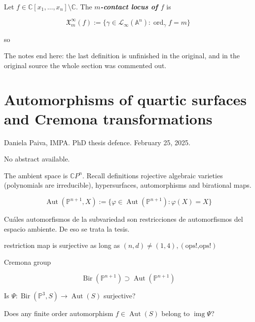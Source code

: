\begin{definition}
\label{definition-badur-3}
Let $f \in
\mathbb{C}[x_1,\ldots,x_n]\setminus
\mathbb{C}$. The \textit{\textbf{$m$-contact
locus of $f$}} is

$$
\mathfrak{X}_{m}^\infty(f):=\{\gamma \in
\mathcal{L}_\infty(\mathbb{A}^n):
\operatorname{ord}_\gamma f=m\}
$$

so
\end{definition}

\medskip{} The
notes end here: the last definition is
unfinished in the original, and in the
original source the whole section was
commented out.

\section{Automorphisms of quartic surfaces
and Cremona transformations}
\label{section-paiva-quartic-cremona}

\noindent
Daniela Paiva, IMPA.
PhD thesis defence.
February 25, 2025.

\medskip\noindent
No abstract available.

\medskip{}

The ambient space is $\mathbb{C}P^{n}$.
Recall definitions rojective algebraic
varieties (polynomials are irreducible),
hypersurfaces, automorphisms and birational
maps.

$$
\operatorname{Aut}(\mathbb{P}^{n+1},X):=\{
\varphi\in
\operatorname{Aut}(\mathbb{P}^{n+1}):
\varphi(X)=X\}
$$

\medskip{}
Cu\'ales automorfismos de la subvariedad son
restricciones de automorfismos del espacio
ambiente. De eso se trata la tesis.

\begin{theorem}
\label{theorem-paiva-1}
restriction map is surjective as long as
$(n,d) \neq (1,4), (\text{ops!,ops!})$
\end{theorem}

Cremona group

$$
\operatorname{Bir}(\mathbb{P}^{n+1})
\supset\operatorname{Aut}(\mathbb{P}^{n+1})
$$

\medskip{}
Is $\Psi: \operatorname{Bir}(\mathbb{P}^3,S)
\longrightarrow \operatorname{Aut}(S)$
surjective?

\medskip{}
Does any finite order automorphism $f \in
\operatorname{Aut}(S)$ belong to
$\operatorname{img}\Psi$?

